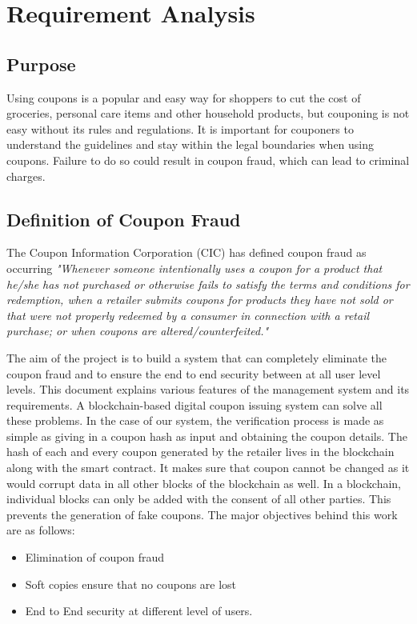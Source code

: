 \chapter{Requirement Analysis}
\section{Purpose}
\par
Using coupons is a popular and easy way for shoppers to cut the cost of
groceries, personal care items and other household products, but couponing is not easy
without its rules and regulations. It is important for couponers to understand the
guidelines and stay within the legal boundaries when using coupons. Failure to
do so could result in coupon fraud, which can lead to criminal charges.

\section{Definition of Coupon Fraud}
The Coupon Information Corporation (CIC) has defined coupon fraud as
occurring \textit{"Whenever someone intentionally uses a coupon for a product that
he/she has not purchased or otherwise fails to satisfy the terms and conditions
for redemption, when a retailer submits coupons for products they have not sold
or that were not properly redeemed by a consumer in connection with a retail
purchase; or when coupons are altered/counterfeited."}
\par
The aim of the project is to build a system that can completely eliminate
the coupon fraud and to ensure the end to end security between at all user level
levels. This document explains various features of the management system and
its requirements.
A blockchain-based digital coupon issuing system can solve all these
problems. In the case of our system, the verification process is made as simple
as giving in a coupon hash as input and obtaining the coupon details. The hash of
each and every coupon generated by the retailer lives in the blockchain along with
the smart contract. It makes sure that coupon cannot be changed as it would
corrupt data in all other blocks of the blockchain as well. In a blockchain,
individual blocks can only be added with the consent of all other parties. This
prevents the generation of fake coupons.
The major objectives behind this work are as follows:
\begin{itemize}
    \item Elimination of coupon fraud
    \item Soft copies ensure that no coupons are lost 
    \item End to End security at different level of users.
\end{itemize}
